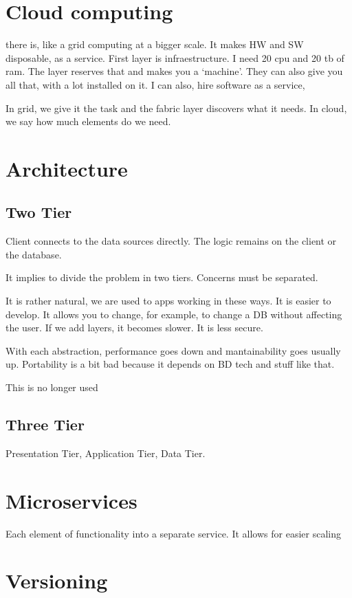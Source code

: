 \section{Cloud computing}

there is, like a grid computing at a bigger scale. It makes HW and SW disposable, as a service. First layer is infraestructure. I need 20 cpu and 20 tb of ram. The layer reserves that and makes you a `machine'. They can also give you all that, with a lot installed on it. I can also, hire software as a service,

In grid, we give it the task and the fabric layer discovers what it needs. In cloud, we say how much elements do we need.

\section{Architecture}

\subsection{Two Tier}
Client connects to the data sources directly. The logic remains on the client or the database.

It implies to divide the problem in two tiers. Concerns must be separated.

It is rather natural, we are used to apps working in these ways. It is easier to develop. It allows you to change, for example, to change a DB without affecting the user. If we add layers, it becomes slower. It is less secure.

With each abstraction, performance goes down and mantainability goes usually up. Portability is a bit bad because it depends on BD tech and stuff like that.

This is no longer used
\subsection{Three Tier}

Presentation Tier, Application Tier, Data Tier.

\section{Microservices}

Each element of functionality into a separate service. It allows for easier scaling

\section{ Versioning}

